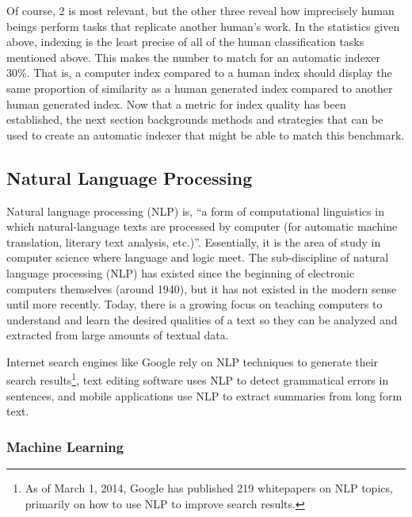 Of course, 2 is most relevant, but the other three reveal how imprecisely human beings perform tasks that replicate another human's work.
In the statistics given above, indexing is the least precise of all of the human classification tasks mentioned above.
This makes the number to match for an automatic indexer 30\%.
That is, a computer index compared to a human index should display the same proportion of similarity as a human generated index compared to another human generated index.
Now that a metric for index quality has been established, the next section backgrounds methods and strategies that can be used to create an automatic indexer that might be able to match this benchmark.

\subsection{Natural Language Processing}

Natural language processing (NLP) is, ``a form of computational linguistics in which natural-language texts are processed by computer (for automatic machine translation, literary text analysis, etc.)''\cite{oed-nlp}.
Essentially, it is the area of study in computer science where language and logic meet.
The sub-discipline of natural language processing (NLP) has existed since the beginning of electronic computers themselves (around 1940), but it has not existed in the modern sense until more recently.
Today, there is a growing focus on teaching computers to understand and learn the desired qualities of a text so they can be analyzed and extracted from large amounts of textual data\cite{jurafsky}.

Internet search engines like Google rely on NLP techniques to generate their search results\footnote{As of March 1, 2014, Google has published 219 whitepapers on NLP topics, primarily on how to use NLP to improve search results.\cite{google-nlp}}, text editing software uses NLP to detect grammatical errors in sentences\cite{norvig}, and mobile applications use NLP to extract summaries from long form text\cite{bit-of-news}.

\subsubsection{Machine Learning}

